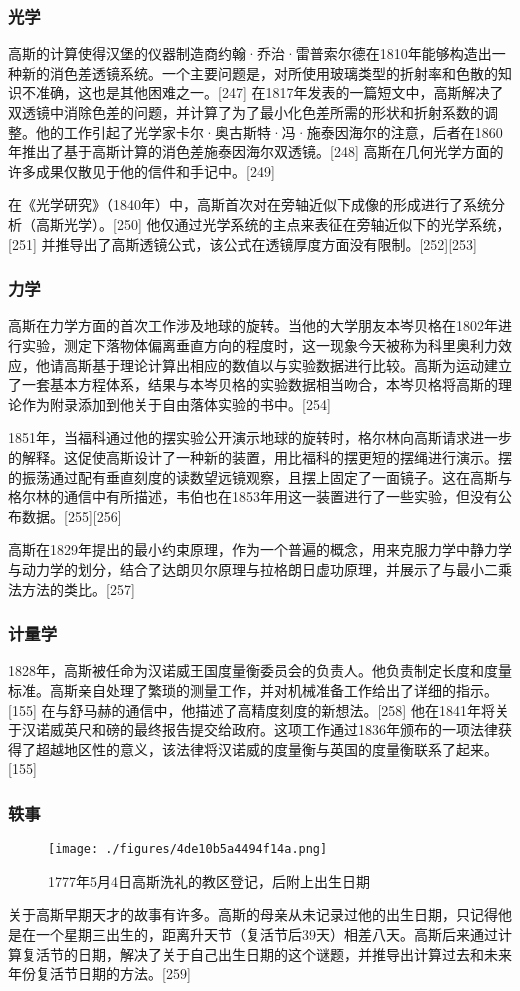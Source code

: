 \subsubsection{光学}
高斯的计算使得汉堡的仪器制造商约翰·乔治·雷普索尔德在1810年能够构造出一种新的消色差透镜系统。一个主要问题是，对所使用玻璃类型的折射率和色散的知识不准确，这也是其他困难之一。[247] 在1817年发表的一篇短文中，高斯解决了双透镜中消除色差的问题，并计算了为了最小化色差所需的形状和折射系数的调整。他的工作引起了光学家卡尔·奥古斯特·冯·施泰因海尔的注意，后者在1860年推出了基于高斯计算的消色差施泰因海尔双透镜。[248] 高斯在几何光学方面的许多成果仅散见于他的信件和手记中。[249]

在《光学研究》（1840年）中，高斯首次对在旁轴近似下成像的形成进行了系统分析（高斯光学）。[250] 他仅通过光学系统的主点来表征在旁轴近似下的光学系统，[251] 并推导出了高斯透镜公式，该公式在透镜厚度方面没有限制。[252][253]
\subsubsection{力学} 
高斯在力学方面的首次工作涉及地球的旋转。当他的大学朋友本岑贝格在1802年进行实验，测定下落物体偏离垂直方向的程度时，这一现象今天被称为科里奥利力效应，他请高斯基于理论计算出相应的数值以与实验数据进行比较。高斯为运动建立了一套基本方程体系，结果与本岑贝格的实验数据相当吻合，本岑贝格将高斯的理论作为附录添加到他关于自由落体实验的书中。[254]

1851年，当福科通过他的摆实验公开演示地球的旋转时，格尔林向高斯请求进一步的解释。这促使高斯设计了一种新的装置，用比福科的摆更短的摆绳进行演示。摆的振荡通过配有垂直刻度的读数望远镜观察，且摆上固定了一面镜子。这在高斯与格尔林的通信中有所描述，韦伯也在1853年用这一装置进行了一些实验，但没有公布数据。[255][256]

高斯在1829年提出的最小约束原理，作为一个普遍的概念，用来克服力学中静力学与动力学的划分，结合了达朗贝尔原理与拉格朗日虚功原理，并展示了与最小二乘法方法的类比。[257]
\subsubsection{计量学} 
1828年，高斯被任命为汉诺威王国度量衡委员会的负责人。他负责制定长度和度量标准。高斯亲自处理了繁琐的测量工作，并对机械准备工作给出了详细的指示。[155] 在与舒马赫的通信中，他描述了高精度刻度的新想法。[258] 他在1841年将关于汉诺威英尺和磅的最终报告提交给政府。这项工作通过1836年颁布的一项法律获得了超越地区性的意义，该法律将汉诺威的度量衡与英国的度量衡联系了起来。[155]
\subsubsection{轶事}
\begin{figure}[ht]
\centering
\texttt{[image: ./figures/4de10b5a4494f14a.png]}
\caption{1777年5月4日高斯洗礼的教区登记，后附上出生日期} \label{fig_KRGS_24}
\end{figure}
关于高斯早期天才的故事有许多。高斯的母亲从未记录过他的出生日期，只记得他是在一个星期三出生的，距离升天节（复活节后39天）相差八天。高斯后来通过计算复活节的日期，解决了关于自己出生日期的这个谜题，并推导出计算过去和未来年份复活节日期的方法。[259]

